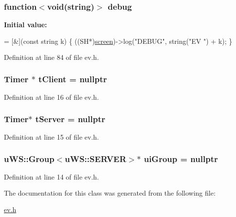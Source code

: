 \subsubsection[{\texorpdfstring{debug}{debug}}]{\setlength{\rightskip}{0pt plus 5cm}function$<$void(string)$>$ debug}\hypertarget{class_k_1_1_e_v_ab04bc4fb6f845a182c6ee0a32c67550c}{}\label{class_k_1_1_e_v_ab04bc4fb6f845a182c6ee0a32c67550c}
{\bfseries Initial value\+:}
\begin{DoxyCode}
= [&](\textcolor{keyword}{const} \textcolor{keywordtype}{string} k) \{
        ((SH*)\hyperlink{class_k_1_1_klass_a5819639653d62dde47c40c9d0c06f7ac}{screen})->log(\textcolor{stringliteral}{"DEBUG"}, \textcolor{keywordtype}{string}(\textcolor{stringliteral}{"EV "}) + k);
      \}
\end{DoxyCode}


Definition at line 84 of file ev.\+h.

\subsubsection[{\texorpdfstring{t\+Client}{tClient}}]{\setlength{\rightskip}{0pt plus 5cm}Timer $\ast$ t\+Client = nullptr}\hypertarget{class_k_1_1_e_v_ae69ff430a805e08decf0feee8938b9b7}{}\label{class_k_1_1_e_v_ae69ff430a805e08decf0feee8938b9b7}


Definition at line 16 of file ev.\+h.

\subsubsection[{\texorpdfstring{t\+Server}{tServer}}]{\setlength{\rightskip}{0pt plus 5cm}Timer$\ast$ t\+Server = nullptr}\hypertarget{class_k_1_1_e_v_a3528df0e9a2cf9a83ad1a92b6a79a5d4}{}\label{class_k_1_1_e_v_a3528df0e9a2cf9a83ad1a92b6a79a5d4}


Definition at line 15 of file ev.\+h.

\subsubsection[{\texorpdfstring{ui\+Group}{uiGroup}}]{\setlength{\rightskip}{0pt plus 5cm}u\+W\+S\+::\+Group$<$u\+W\+S\+::\+S\+E\+R\+V\+ER$>$$\ast$ ui\+Group = nullptr}\hypertarget{class_k_1_1_e_v_a9224c71ab6f6621adf6069f9c9adc751}{}\label{class_k_1_1_e_v_a9224c71ab6f6621adf6069f9c9adc751}


Definition at line 14 of file ev.\+h.



The documentation for this class was generated from the following file\+:\begin{DoxyCompactItemize}
\item 
\hyperlink{ev_8h}{ev.\+h}\end{DoxyCompactItemize}
